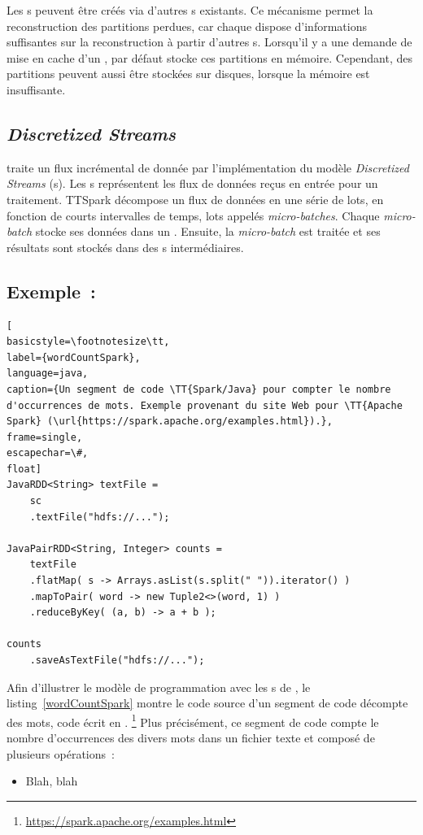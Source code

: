 Les s peuvent \^etre cr\'e\'es via d'autres s existants. Ce m\'ecanisme permet la reconstruction des partitions perdues, car chaque  dispose d'informations suffisantes sur la reconstruction \`a partir d'autres s. Lorsqu'il y a une demande de mise en cache d'un , par d\'efaut  stocke ces partitions en m\'emoire. Cependant, des partitions peuvent aussi \^etre stock\'ees sur disques, lorsque la m\'emoire est insuffisante.


\subsection{\emph{Discretized Streams}}

 traite un flux incr\'emental de donn\'ee par l'implémentation du mod\`ele \emph{Discretized Streams} (s).   
%
%
Les s repr\'esentent les flux de donn\'ees re\c{c}us en entr\'ee pour un traitement. 
%
TT{Spark} d\'ecompose un flux de donn\'ees en une s\'erie de lots, en fonction de courts intervalles de temps, lots appel\'es \emph{micro-batches}. Chaque \emph{micro-batch} stocke ses donn\'ees dans un . Ensuite, la \emph{micro-batch} est trait\'ee et ses r\'esultats sont stock\'es dans des s interm\'ediaires.


\subsection{Exemple~: }


\begin{lstlisting}[
basicstyle=\footnotesize\tt,
label={wordCountSpark},
language=java,
caption={Un segment de code \TT{Spark/Java} pour compter le nombre d'occurrences de mots. Exemple provenant du site Web pour \TT{Apache Spark} (\url{https://spark.apache.org/examples.html}).},
frame=single,
escapechar=\#,
float]
JavaRDD<String> textFile = 
    sc
    .textFile("hdfs://...");

JavaPairRDD<String, Integer> counts = 
    textFile
    .flatMap( s -> Arrays.asList(s.split(" ")).iterator() )
    .mapToPair( word -> new Tuple2<>(word, 1) )
    .reduceByKey( (a, b) -> a + b );

counts
    .saveAsTextFile("hdfs://...");
\end{lstlisting}


Afin d'illustrer le mod\`ele de programmation avec les s de , le listing~\ref{wordCountSpark} montre le code source d'un segment de code d\'ecompte des mots, code \'ecrit en .%
%
\footnote{\url{https://spark.apache.org/examples.html}}
%
Plus pr\'ecis\'ement, ce segment de code compte le nombre d'occurrences des divers mots dans un fichier texte et compos\'e de plusieurs op\'erations~: 
\begin{itemize}
\item Blah, blah
\end{itemize}



